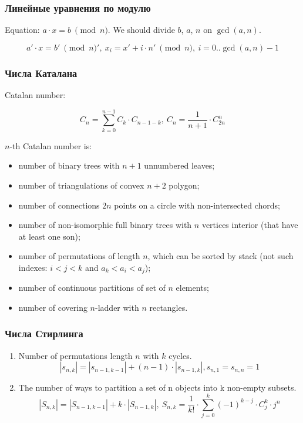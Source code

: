 \subsubsection{Линейные уравнения по модулю}

Equation: $a \cdot x = b\ \pmod n$. We should divide $b$, $a$, $n$ on $\gcd {(a, n)}$.

$$a' \cdot x = b'\ \pmod n',\ x_i = x' + i \cdot n'\ \pmod n,\ i = 0..\gcd{(a, n)} - 1$$

\subsubsection{Числа Каталана}

Catalan number: 

$$C_n = \sum_{k = 0}^{n-1} C_k \cdot C_{n-1-k},\ C_n = \frac{1}{n+1} \cdot C_{2n}^{n}$$

$n$-th Catalan number is:
\begin {itemize}
	\item number of binary trees with $n+1$ unnumbered leaves;
	\item number of triangulations of convex $n+2$ polygon;
	\item number of connections $2n$ points on a circle with non-intersected chords;
	\item number of non-isomorphic full binary trees with $n$ vertices interior (that have at least one son);
	\item number of permutations of length $n$, which can be sorted by stack (not such indexes: $i < j < k$ and $a_k < a_i < a_j$);
	\item number of continuous partitions of set of $n$ elements;
	\item number of covering $n$-ladder with $n$ rectangles.
\end {itemize}
 
\subsubsection{Числа Стирлинга}

\begin {enumerate} [I]
	\item Number of permutations length $n$ with $k$ cycles.
	$$|s_{n, k}| = |s_{n-1, k-1}| + (n-1) \cdot |s_{n-1, k}|, s_{n, 1} = s_{n, n} = 1$$
	\item The number of ways to partition a set of n objects into k non-empty subsets.
	$$|S_{n, k}| = |S_{n-1, k-1}| + k \cdot |S_{n-1, k}|,\ S_{n, k} = \frac{1}{k!} \cdot \sum_{j=0}^{k} (-1)^{k-j}\cdot C_j^k \cdot j^n$$
\end {enumerate}

